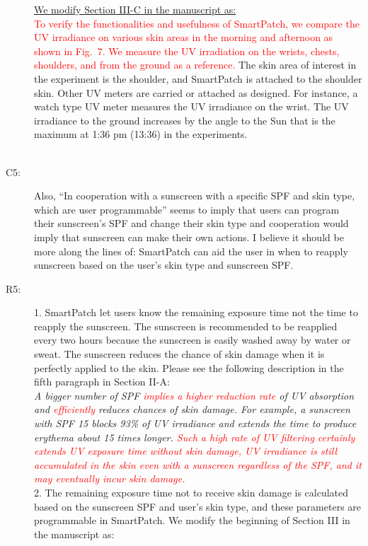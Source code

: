 \documentclass[onecolumn]{IEEEconf}
\begin{document}
\begin{description}
\underline{We modify Section III-C in the manuscript as:}\\
\textcolor{red}{To verify the functionalities and usefulness of SmartPatch, we compare the UV irradiance on various skin areas in the morning and afternoon as shown in Fig.~7. We measure the UV irradiation on the wrists, chests, shoulders, and from the ground as a reference.} The skin area of interest in the experiment is the shoulder, and SmartPatch is attached to the shoulder skin. Other UV meters are carried or attached as designed. For instance, a watch type UV meter measures the UV irradiance on the wrist. The UV irradiance to the ground increases by the angle to the Sun that is the maximum at 1:36 pm (13:36) in the experiments.\\
~\\


\item [C5:] Also, ``In cooperation with a sunscreen with a specific SPF and skin type, which are user programmable'' seems to imply that users can program their sunscreen's SPF and change their skin type and cooperation would imply that sunscreen can make their own actions. I believe it should be more along the lines of: SmartPatch can aid the user in when to reapply sunscreen based on the user's skin type and sunscreen SPF.

\item [R5: ] 
1. SmartPatch let users know the remaining exposure time not the time to reapply the sunscreen. The sunscreen is recommended to be reapplied every two hours because the sunscreen is easily washed away by water or sweat. The sunscreen reduces the chance of skin damage when it is perfectly applied to the skin. Please see the following description in the fifth paragraph in Section II-A:\\

\textit{A bigger number of SPF \textcolor{red}{implies a higher reduction rate} of UV absorption and \textcolor{red}{efficiently} reduces chances of skin damage. For example, a sunscreen with SPF 15 blocks 93\% of UV irradiance and extends the time to produce erythema about 15 times longer. \textcolor{red}{Such a high rate of UV filtering certainly extends UV exposure time without skin damage, UV irradiance is still accumulated in the skin even with a sunscreen regardless of the SPF, and it may eventually incur skin damage.}}\\

2. The remaining exposure time not to receive skin damage is calculated based on the sunscreen SPF and user's skin type, and these parameters are programmable in SmartPatch. We modify the beginning of Section III in the manuscript as:


\end{description}
\end{document}
